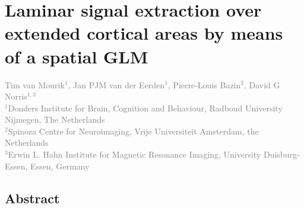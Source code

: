 
\chapter{Laminar signal extraction over extended cortical areas by means of a spatial GLM}
\label{ch:glm}

\textcolor{gray}{{Tim van Mourik$^{1}$}, Jan PJM van der Eerden$^{1}$, Pierre-Louis Bazin$^{2}$, David G Norris$^{1,3}$\\
$^{1}$Donders Institute for Brain, Cognition and Behaviour, Radboud University Nijmegen, The Netherlands\\
$^{2}$Spinoza Centre for Neuroimaging, Vrije Universiteit Amsterdam, the Netherlands\\
$^{3}$Erwin L. Hahn Institute for Magnetic Resonance Imaging, University Duisburg-Essen, Essen, Germany}\\


\linespread{1.5}
\newpage
\section*{Abstract}


\newpage









